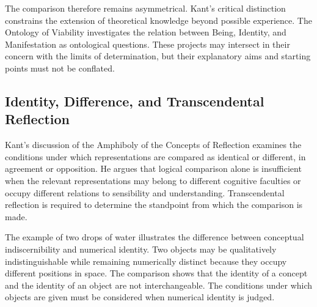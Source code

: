\label{para:VS.B01.P01.C08.S10.SS11.P005}

The comparison therefore remains asymmetrical.
Kant's critical distinction constrains
the extension of theoretical knowledge
beyond possible experience. The Ontology
of Viability investigates the relation
between Being, Identity, and Manifestation
as ontological questions. These projects
may intersect in their concern with the
limits of determination, but their
explanatory aims and starting points
must not be conflated.



\subsection{Identity, Difference, and Transcendental Reflection}
\label{subsec:ch08-kant-identity-difference}

\label{para:VS.B01.P01.C08.S10.SS12.P001}

Kant's discussion of the Amphiboly of the Concepts
of Reflection examines the conditions under which
representations are compared as identical or
different, in agreement or opposition. He argues
that logical comparison alone is insufficient
when the relevant representations may belong
to different cognitive faculties or occupy
different relations to sensibility and understanding.
Transcendental reflection is required to determine
the standpoint from which the comparison is made.
\cite[A260/B316--A292/B349]{KantCritiquePureReason}

\label{para:VS.B01.P01.C08.S10.SS12.P002}

The example of two drops of water illustrates
the difference between conceptual indiscernibility
and numerical identity. Two objects may be
qualitatively indistinguishable while remaining
numerically distinct because they occupy
different positions in space. The comparison
shows that the identity of a concept and the
identity of an object are not interchangeable.
The conditions under which objects are given
must be considered when numerical identity
is judged.

\label{para:VS.B01.P01.C08.S10.SS12.P003}

